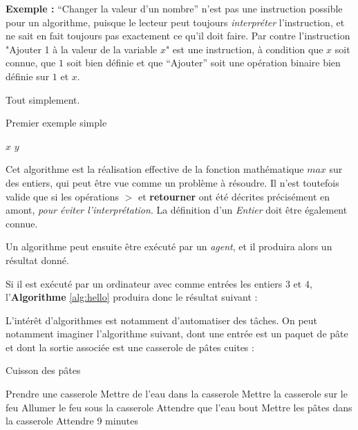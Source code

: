 \documentclass[../../main.tex]{subfiles}
\begin{document}
\textbf{Exemple :} ``Changer la valeur d'un nombre'' n'est pas une instruction possible pour un algorithme, puisque le lecteur peut toujours \textit{interpréter} l'instruction, et ne sait en fait toujours pas exactement ce qu'il doit faire. Par contre l'instruction "Ajouter 1 à la valeur de la variable $x$" est une instruction, à condition que $x$ soit connue, que $1$ soit bien définie et que ``Ajouter'' soit une opération binaire bien définie sur $1$ et $x$.

Tout simplement.

\begin{algorithm}
\caption{Premier exemple simple}\label{alg:hello}
 {
	\Return $x$\;
} {
	\Return $y$\;
}
\end{algorithm}

Cet algorithme est la réalisation effective de la fonction mathématique $max$ sur des entiers, qui peut être vue comme un problème à résoudre. Il n'est toutefois valide que si les opérations $>$ et \textbf{retourner} ont été décrites précisément en amont, \textit{pour éviter l'interprétation}. La définition d'un \textit{Entier} doit être également connue.

Un algorithme peut ensuite être exécuté par un \textit{agent}, et il produira alors un résultat donné.


Si il est exécuté par un ordinateur avec comme entrées les entiers $3$ et $4$, l'\textbf{Algorithme }\ref{alg:hello} produira donc le résultat suivant :

\begin{minipage}{1.\textwidth} 
\end{minipage}

L'intérêt d'algorithmes est notamment d'automatiser des tâches. On peut notamment imaginer l'algorithme suivant, dont une entrée est un paquet de pâte et dont la sortie associée est une casserole de pâtes cuites :

\begin{algorithm}
\caption{Cuisson des pâtes}\label{alg:letters}
Prendre une casserole\;
Mettre de l'eau dans la casserole\;
Mettre la casserole sur le feu\;
Allumer le feu sous la casserole\;
 {
	Attendre que l'eau bout\;
}
Mettre les pâtes dans la casserole\;
Attendre 9 minutes\;
\end{algorithm}
\end{document}
